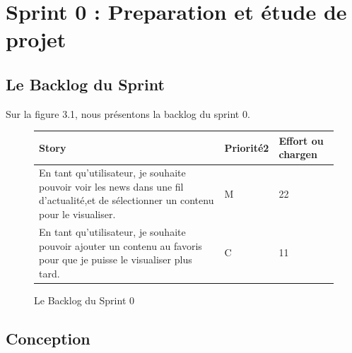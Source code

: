 \chapter{Sprint 0 : Preparation et étude de projet}
\label{Chapitre 3} %



\section{Le Backlog du Sprint}

Sur la figure 3.1, nous présentons la backlog du sprint 0.
\begin{figure}[H]
\begin{tabular}{|p{7cm}|p{4cm}|p{4cm}|}
\hline
\textbf{Story} & \textbf{Priorité2 } & \textbf{Effort ou chargen} \\
\hline
En tant qu'utilisateur, je souhaite pouvoir voir les news dans une fil d'actualité,et de sélectionner un contenu pour le visualiser. & \begin{center}M\end{center} & \begin{center}22\end{center}\\
\hline
En tant qu'utilisateur, je souhaite pouvoir ajouter un contenu au favoris pour que je puisse le visualiser plus tard. & \begin{center}C\end{center} & \begin{center}11\end{center}\\
\hline
\end{tabular}
  \caption{Le Backlog du Sprint 0}
  \label{fig:Backlog}
\end{figure}
\section{Conception}
